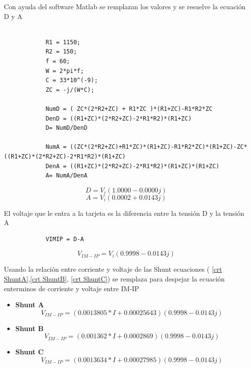         Con ayuda del software Matlab se remplazan los valores y se resuelve la ecuación D y A

        \begin{lstlisting}
            
            R1 = 1150;
            R2 = 150;
            f = 60;
            W = 2*pi*f;
            C = 33*10^(-9);
            ZC = -j/(W*C);

            NumD = ( ZC*(2*R2+ZC) + R1*ZC )*(R1+ZC)-R1*R2*ZC
            DenD = ((R1+ZC)*(2*R2+ZC)-2*R1*R2)*(R1+ZC)
            D= NumD/DenD

            NumA = ((ZC*(2*R2+ZC)+R1*ZC)*(R1+ZC)-R1*R2*ZC)*(R1+ZC)-ZC*((R1+ZC)*(2*R2+ZC)-2*R1*R2)*(R1+ZC)
            DenA = ((R1+ZC)*(2*R2+ZC)-2*R1*R2)*(R1+ZC)*(R1+ZC)
            A= NumA/DenA
        \end{lstlisting}

        \begin{equation}\label{Tension D}
            D = V_{ i }( 1.0000 - 0.0000j)
        \end{equation}
        \begin{equation}\label{Tension A}
            A = V_{ i }( 0.0002 + 0.0143j)
        \end{equation}
        
        El voltaje que le entra a la tarjeta es la diferencia entre la tensión D y la tensión A

        \begin{lstlisting}
            VIMIP = D-A
        \end{lstlisting}

        \begin{equation}\label{Tension V IM-IP}
            V_{IM-IP} = V_{ i }( 0.9998 - 0.0143j)
        \end{equation}

        
        Usando la relación entre corriente y voltaje de las Shunt ecuaciones ( \ref{crt ShuntA},\ref{crt ShuntB}, \ref{crt ShuntC}) se remplaza para despejar la ecuación enterminos de corriente y voltaje entre IM-IP
        \begin{itemize}
            \item \textbf{Shunt A} 
                \begin{equation}\label{Tension V IM-IP}
                    V_{IM-IP} = (0.0013805*I + 0.00025643)( 0.9998 - 0.0143j)
                \end{equation}
            \item \textbf{Shunt B} 
                \begin{equation}\label{Tension V IM-IP}
                    V_{IM-IP} = (0.001362*I + 0.0002869)( 0.9998 - 0.0143j)
                \end{equation}
            \item \textbf{Shunt C} 
                \begin{equation}\label{Tension V IM-IP}
                    V_{IM-IP} = (0.0013634*I + 0.00027985)( 0.9998 - 0.0143j)
                \end{equation}
        \end{itemize}

